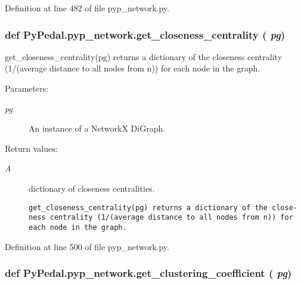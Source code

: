 Definition at line 482 of file pyp\_\-network.py.\hypertarget{namespacePyPedal_1_1pyp__network_12847e12c06671b75f871dbae171097a}{
\subsubsection[get\_\-closeness\_\-centrality]{\setlength{\rightskip}{0pt plus 5cm}def Py\-Pedal.pyp\_\-network.get\_\-closeness\_\-centrality ( {\em pg})}}
\label{namespacePyPedal_1_1pyp__network_12847e12c06671b75f871dbae171097a}


get\_\-closeness\_\-centrality(pg) returns a dictionary of the closeness centrality (1/(average distance to all nodes from n)) for each node in the graph. 

\begin{Desc}
\item[Parameters:]
\begin{description}
\item[{\em pg}]An instance of a Network\-X Di\-Graph. \end{description}
\end{Desc}
\begin{Desc}
\item[Return values:]
\begin{description}
\item[{\em A}]dictionary of closeness centralities.

\footnotesize\begin{verbatim}get_closeness_centrality(pg) returns a dictionary of the close-
ness centrality (1/(average distance to all nodes from n)) for
each node in the graph.
\end{verbatim}
\normalsize
 \end{description}
\end{Desc}


Definition at line 500 of file pyp\_\-network.py.\hypertarget{namespacePyPedal_1_1pyp__network_0932c10c8b90d448400e609753602e3c}{
\subsubsection[get\_\-clustering\_\-coefficient]{\setlength{\rightskip}{0pt plus 5cm}def Py\-Pedal.pyp\_\-network.get\_\-clustering\_\-coefficient ( {\em pg})}}
\label{namespacePyPedal_1_1pyp__network_0932c10c8b90d448400e609753602e3c}


